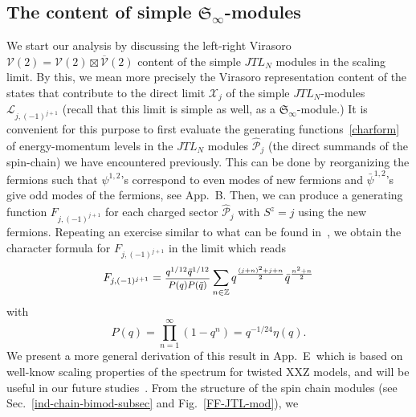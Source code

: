 \documentclass[11pt]{article}
\newcommand{\ffrac}[2]{\mbox{\footnotesize$\displaystyle\frac{#1}{#2}$}}
\newcommand{\JTL}[1]{JTL_{#1}}
\newcommand{\oZ}{\mathbb{Z}}
\newcommand{\Vir}{\mathcal{V}}
\newcommand{\VirN}{\boldsymbol{\mathcal{V}}}
\newcommand{\interLie}{\mathfrak{S}}
\newcommand{\interinfin}{\interLie_{\infty}}
\newcommand{\interM}[1]{\mathscr{X}_{#1}}
\newcommand{\AIrrTL}[2]{\mathscr{L}_{#1,#2}}
\newcommand{\APrTL}[1]{\widehat{\mathscr{P}}_{#1}}
\newcommand{\Appglinf}{B}
\newcommand{\AppChar}{E}
\theoremstyle{definition}
\begin{document}
\subsection{The content of simple $\interinfin$-modules}\label{sec:interinfin-sm}
We start our analysis by discussing the left-right Virasoro $\VirN(2)=\Vir(2)\boxtimes\overline{\Vir}(2)$ content of the
simple $\JTL{N}$ modules in the scaling limit. By this, we mean more precisely  the Virasoro
representation content of the states that contribute to the direct
limit $\interM{j}$ of the simple $\JTL{N}$-modules $\AIrrTL{j}{(-1)^{j+1}}$ (recall that this limit is simple as well, as a $\interinfin$-module.)
 It is convenient for this purpose to
first evaluate the generating functions~\eqref{charform} of energy-momentum levels in  the
$\JTL{N}$ modules $\APrTL{j}$ (the direct summands of the spin-chain) we have encountered previously. This can be done by reorganizing the fermions such that $\psi^{1,2}$'s correspond to even modes of new fermions and  $\bar{\psi}^{1,2}$'s give odd modes of the fermions, see App.~\Appglinf. Then, we can produce a generating function $F_{j,(-1)^{j+1}}$ for each charged sector $\APrTL{j}$ with $S^z=j$ using the new fermions. Repeating an   exercise similar to what can be found in~\cite{Kac-book}, we obtain the character formula for $F_{j,(-1)^{j+1}}$ in the limit which reads
%
  \begin{equation}
   F_{j,(-1)^{j+1}}=\ffrac{q^{1/12}\bar{q}^{1/12}}{P(q)P(\bar{q})}
     \sum_{n\in \oZ}q^{\frac{(j+n)^2+j+n}{2}}
    \bar{q}^{\frac{n^2+n}{2}}
     \end{equation}
with
\begin{equation}\label{Pq}
\displaystyle P(q) =  \prod_{n=1}^{\infty} (1 - q^n) = q^{-1/24} \eta (q).
\end{equation}
We present a  more general derivation of this  result in App.~\AppChar~which is based on well-know scaling properties of the spectrum for twisted XXZ models, and will be useful in our future studies~\cite{GRS4}.
From the structure of the spin chain modules (see
Sec.~\ref{ind-chain-bimod-subsec} and Fig.~\ref{FF-JTL-mod}), we
\end{document}
